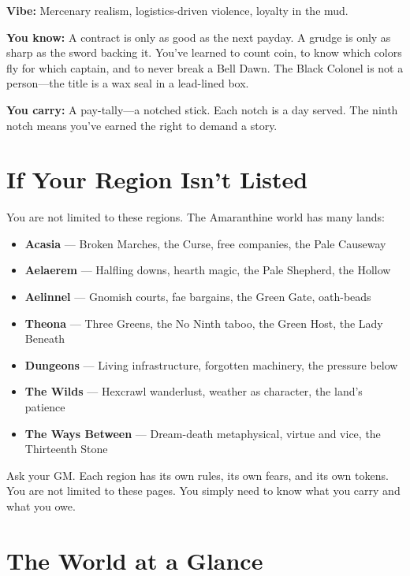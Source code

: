 \documentclass[10pt]{article}
\begin{document}
\textbf{Vibe:} Mercenary realism, logistics-driven violence, loyalty in the mud.

\textbf{You know:} A contract is only as good as the next payday. A grudge is 
only as sharp as the sword backing it. You've learned to count coin, to know 
which colors fly for which captain, and to never break a Bell Dawn. The Black 
Colonel is not a person—the title is a wax seal in a lead-lined box.

\textbf{You carry:} A pay-tally—a notched stick. Each notch is a day served. 
The ninth notch means you've earned the right to demand a story.

\section*{If Your Region Isn't Listed}

You are not limited to these regions. The Amaranthine world has many lands:

\begin{itemize}
\item \textbf{Acasia} — Broken Marches, the Curse, free companies, the Pale Causeway
\item \textbf{Aelaerem} — Halfling downs, hearth magic, the Pale Shepherd, the Hollow
\item \textbf{Aelinnel} — Gnomish courts, fae bargains, the Green Gate, oath-beads
\item \textbf{Theona} — Three Greens, the No Ninth taboo, the Green Host, the Lady Beneath
\item \textbf{Dungeons} — Living infrastructure, forgotten machinery, the pressure below
\item \textbf{The Wilds} — Hexcrawl wanderlust, weather as character, the land's patience
\item \textbf{The Ways Between} — Dream-death metaphysical, virtue and vice, the Thirteenth Stone
\end{itemize}

Ask your GM. Each region has its own rules, its own fears, and its own tokens. 
You are not limited to these pages. You simply need to know what you carry 
and what you owe.

\section*{The World at a Glance}
\end{document}
